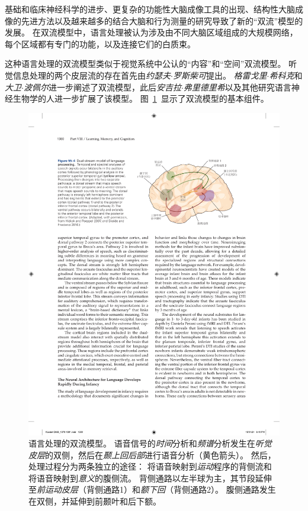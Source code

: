 基础和临床神经科学的进步、更复杂的功能性大脑成像工具的出现、结构性大脑成像的先进方法以及越来越多的结合大脑和行为测量的研究导致了新的“双流”模型的发展。
在双流模型中，语言处理被认为涉及由不同大脑区域组成的大规模网络，每个区域都有专门的功能，以及连接它们的白质束。


这种语言处理的双流模型类似于视觉系统中公认的“内容”和“空间”双流模型。
听觉信息处理的两个皮层流的存在首先由\textit{约瑟夫$\cdot$罗斯柴可}提出。
\textit{格雷戈里$\cdot$希科克}和\textit{大卫$\cdot$波佩尔}进一步阐述了双流模型，此后\textit{安吉拉$\cdot$弗里德里希}以及其他研究语言神经生物学的人进一步扩展了该模型。
图~\ref{fig:55_4}~显示了双流模型的基本组件。


\begin{figure}[htbp]
	\centering
	\includegraphics[width=0.77\linewidth]{chap55/fig_55_4}
	\caption{语言处理的双流模型。
		语音信号的\textit{时间}分析和\textit{频谱}分析发生在\textit{听觉皮层}的双侧，然后在\textit{颞上回后部}进行语音分析（黄色箭头）。
		然后，处理过程分为两条独立的途径：
		将语音映射到\textit{运动}程序的背侧流和将语音映射到\textit{意义}的腹侧流。
		背侧通路以左半球为主，其节段延伸至\textit{前运动皮层}（背侧通路1）和\textit{额下回}（背侧通路2）。
		腹侧通路发生在双侧，并延伸到前颞叶和后下额\cite{hickok2007cortical,skeide2016ontogeny}。}
	\label{fig:55_4}
\end{figure}


